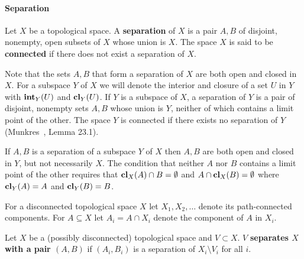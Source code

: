 

\paragraph{Separation}

Let $X$ be a topological space.
A \textbf{separation} of $X$ is a pair $A, B$ of disjoint, nonempty, open subsets of $X$ whose union is $X$.
The space $X$ is said to be \textbf{connected} if there does not exist a separation of $X$.

Note that the sets $A, B$ that form a separation of $X$ are both open and closed in $X$.
For a subspace $Y$ of $X$ we will denote the interior and closure of a set $U$ in $Y$ with $\mathbf{int}_Y(U)$ and $\mathbf{cl}_Y(U)$.
If $Y$ is a subspace of $X$, a separation of $Y$ is a pair of disjoint, nonempty sets $A, B$ whose union is $Y$, neither of which contains a limit point of the other.
The space $Y$ is connected if there exists no separation of $Y$ (Munkres~\cite{munkres00topology}, Lemma 23.1).

If $A, B$ is a separation of a subspace $Y$ of $X$ then $A, B$ are both open and closed in $Y$, but not necessarily $X$.
The condition that neither $A$ nor $B$ contains a limit point of the other requires that $\mathbf{cl}_X(A)\cap B = \emptyset$ and $A\cap \mathbf{cl}_X(B) =\emptyset$ where $\mathbf{cl}_Y(A) = A$ and $\mathbf{cl}_Y(B) = B$.


For a disconnected topological space $X$ let $X_1, X_2, \ldots$ denote its path-connected components.
For $A\subseteq X$ let $A_i = A\cap X_i$ denote the component of $A$ in $X_i$.

\begin{definition}
  Let $X$ be a (possibly disconnected) topological space and $V\subset X$.
  $V$ \textbf{separates $X$ with a pair $(A, B)$} if $(A_i, B_i)$ is a separation of $X_i\setminus V_i$ for all $i$.
\end{definition}


